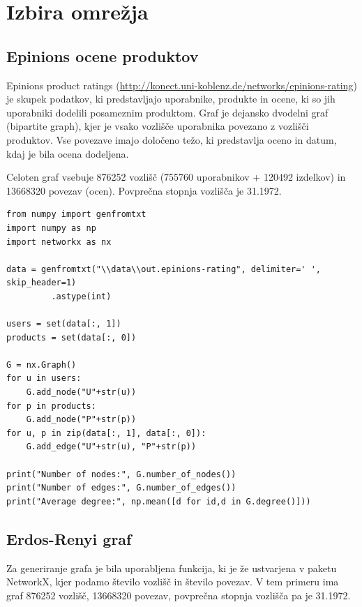\documentclass[a4paper,11pt]{article}
\begin{document}
\section{Izbira omrežja}

\subsection{Epinions ocene produktov}

Epinions product ratings (\href{http://konect.uni-koblenz.de/networks/epinions-rating}{http://konect.uni-koblenz.de/networks/epinions-rating}) je skupek podatkov, ki predstavljajo uporabnike, produkte in ocene, ki so jih uporabniki dodelili posameznim produktom. Graf je dejansko dvodelni graf (bipartite graph), kjer je vsako vozlišče uporabnika povezano z vozlišči produktov. Vse povezave imajo določeno težo, ki predstavlja oceno in datum, kdaj je bila ocena dodeljena.

Celoten graf vsebuje 876252 vozlišč (755760 uporabnikov + 120492 izdelkov) in 13668320 povezav (ocen). Povprečna stopnja vozlišča je 31.1972.

\begin{lstlisting}
from numpy import genfromtxt
import numpy as np
import networkx as nx

data = genfromtxt("\\data\\out.epinions-rating", delimiter=' ', skip_header=1)
		 .astype(int)

users = set(data[:, 1])
products = set(data[:, 0])

G = nx.Graph()
for u in users:
    G.add_node("U"+str(u))
for p in products:
    G.add_node("P"+str(p))
for u, p in zip(data[:, 1], data[:, 0]):
    G.add_edge("U"+str(u), "P"+str(p))

print("Number of nodes:", G.number_of_nodes())
print("Number of edges:", G.number_of_edges())
print("Average degree:", np.mean([d for id,d in G.degree()]))
\end{lstlisting}

\subsection{Erdos-Renyi graf}

Za generiranje grafa je bila uporabljena funkcija, ki je že ustvarjena v paketu NetworkX, kjer podamo število vozlišč in število povezav. V tem primeru ima graf 876252 vozlišč, 13668320 povezav, povprečna stopnja vozlišča pa je 31.1972.
\end{document}
